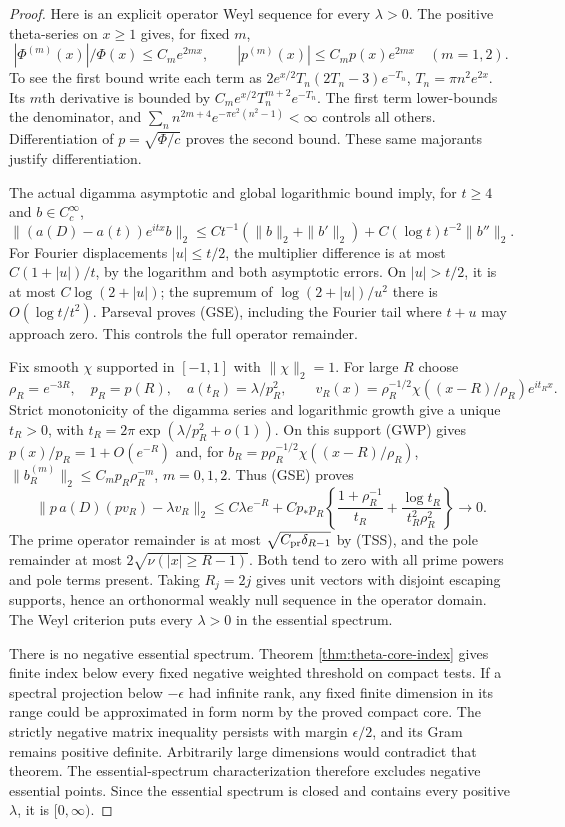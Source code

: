 \documentclass[11pt]{article}
\theoremstyle{remark}\newtheorem{remark}[theorem]{Remark}
\begin{document}
\begin{proof}
Here is an explicit operator Weyl sequence for every $\lambda>0$.
The positive theta-series on $x\ge1$ gives, for fixed $m$,
\[
 |\Phi^{(m)}(x)|/\Phi(x)\le C_me^{2mx},\qquad
 |p^{(m)}(x)|\le C_mp(x)e^{2mx}\quad(m=1,2).              \tag{GWP}
\]
To see the first bound write each term as
$2e^{x/2}T_n(2T_n-3)e^{-T_n}$, $T_n=\pi n^2e^{2x}$.
Its $m$th derivative is bounded by
$C_me^{x/2}T_n^{m+2}e^{-T_n}$. The first term lower-bounds
the denominator, and
$\sum_n n^{2m+4}e^{-\pi e^2(n^2-1)}<\infty$ controls all
others. Differentiation of $p=\sqrt{\Phi/c}$ proves the
second bound. These same majorants justify differentiation.

The actual digamma asymptotic and global logarithmic bound imply,
for $t\ge4$ and $b\in C_c^\infty$,
\[
 \|(a(D)-a(t))e^{itx}b\|_2
 \le Ct^{-1}(\|b\|_2+\|b'\|_2)
                  +C(\log t)t^{-2}\|b''\|_2.             \tag{GSE}
\]
For Fourier displacements $|u|\le t/2$, the multiplier
difference is at most $C(1+|u|)/t$, by the logarithm and both
asymptotic errors. On $|u|>t/2$, it is at most
$C\log(2+|u|)$; the supremum of
$\log(2+|u|)/u^2$ there is $O(\log t/t^2)$.
Parseval proves (GSE), including the Fourier tail where $t+u$
may approach zero. This controls the full operator remainder.

Fix smooth $\chi$ supported in $[-1,1]$ with $\|\chi\|_2=1$.
For large $R$ choose
\[
 \rho_R=e^{-3R},\quad p_R=p(R),\quad
 a(t_R)=\lambda/p_R^2,\qquad
 v_R(x)=\rho_R^{-1/2}\chi((x-R)/\rho_R)e^{it_Rx}.          \tag{GWV}
\]
Strict monotonicity of the digamma series and logarithmic growth
give a unique $t_R>0$, with
$t_R=2\pi\exp(\lambda/p_R^2+o(1))$.
On this support (GWP) gives $p(x)/p_R=1+O(e^{-R})$ and,
for $b_R=p\rho_R^{-1/2}\chi((x-R)/\rho_R)$,
$\|b_R^{(m)}\|_2\le C_mp_R\rho_R^{-m}$, $m=0,1,2$.
Thus (GSE) proves
\[
 \|p\,a(D)(pv_R)-\lambda v_R\|_2
 \le C\lambda e^{-R}
  +Cp_*p_R\left\{\frac{1+\rho_R^{-1}}{t_R}
             +\frac{\log t_R}{t_R^2\rho_R^2}\right\}\to0. \tag{GWR}
\]
The prime operator remainder is at most
$\sqrt{C_{\rm pr}\delta_{R-1}}$ by (TSS), and the pole
remainder at most $2\sqrt{\nu(|x|\ge R-1)}$.
Both tend to zero with all prime powers and pole terms present.
Taking $R_j=2j$ gives unit vectors with disjoint escaping
supports, hence an orthonormal weakly null sequence in the
operator domain. The Weyl criterion
\cite[Lemma 6.17, pp.~145--146]{TeschlQM2009} puts every
$\lambda>0$ in the essential spectrum.

There is no negative essential spectrum. Theorem
\ref{thm:theta-core-index} gives finite index below every fixed
negative weighted threshold on compact tests. If a spectral
projection below $-\epsilon$ had infinite rank, any fixed finite
dimension in its range could be approximated in form norm by
the proved compact core. The strictly negative matrix inequality
persists with margin $\epsilon/2$, and its Gram remains positive
definite. Arbitrarily large dimensions would contradict that
theorem. The essential-spectrum characterization
\cite[eq.~(6.28), p.~145]{TeschlQM2009} therefore excludes
negative essential points. Since the essential spectrum is
closed and contains every positive $\lambda$, it is $[0,\infty)$.


\end{proof}
\end{document}
